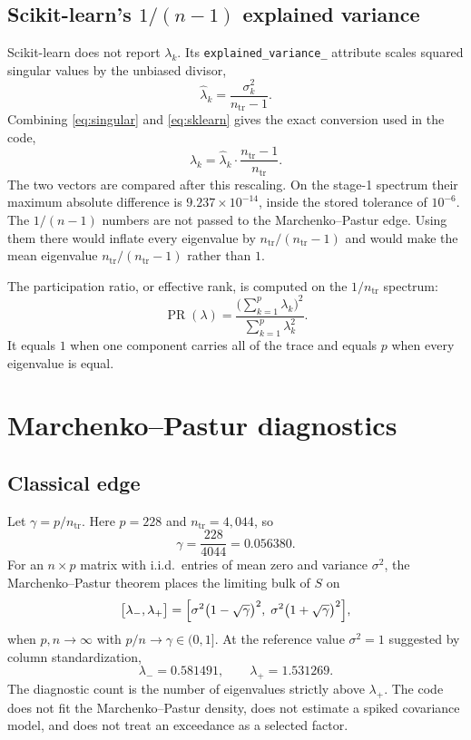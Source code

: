 \documentclass[11pt]{article}
\begin{document}
\subsection{Scikit-learn's \texorpdfstring{\(1/(n-1)\)}{1/(n-1)} explained variance}

Scikit-learn does not report \(\lambda_k\).
Its \texttt{explained\_variance\_} attribute scales squared singular values by the unbiased divisor,
\begin{equation}
\label{eq:sklearn}
\hat\lambda_k=\frac{\sigma_k^2}{n_{\mathrm{tr}}-1}.
\end{equation}
Combining \eqref{eq:singular} and \eqref{eq:sklearn} gives the exact conversion used in the code,
\begin{equation}
\label{eq:convert}
\lambda_k=\hat\lambda_k\cdot\frac{n_{\mathrm{tr}}-1}{n_{\mathrm{tr}}}.
\end{equation}
The two vectors are compared after this rescaling.
On the stage-1 spectrum their maximum absolute difference is \(9.237\times 10^{-14}\), inside the stored tolerance of \(10^{-6}\).
The \(1/(n-1)\) numbers are not passed to the Marchenko--Pastur edge.
Using them there would inflate every eigenvalue by \(n_{\mathrm{tr}}/(n_{\mathrm{tr}}-1)\) and would make the mean eigenvalue \(n_{\mathrm{tr}}/(n_{\mathrm{tr}}-1)\) rather than \(1\).

The participation ratio, or effective rank, is computed on the \(1/n_{\mathrm{tr}}\) spectrum:
\begin{equation}
\label{eq:pr}
\operatorname{PR}(\lambda)=\frac{\bigl(\sum_{k=1}^{p}\lambda_k\bigr)^2}{\sum_{k=1}^{p}\lambda_k^2}.
\end{equation}
It equals \(1\) when one component carries all of the trace and equals \(p\) when every eigenvalue is equal.

\section{Marchenko--Pastur diagnostics}
\label{sec:mp}

\subsection{Classical edge}

Let \(\gamma=p/n_{\mathrm{tr}}\).
Here \(p=228\) and \(n_{\mathrm{tr}}=4{,}044\), so
\[
\gamma=\frac{228}{4044}=0.056380.
\]
For an \(n\times p\) matrix with i.i.d.\ entries of mean zero and variance \(\sigma^2\), the Marchenko--Pastur theorem places the limiting bulk of \(S\) on
\begin{equation}
\label{eq:mp}
\bigl[\lambda_-,\lambda_+\bigr]
=\Bigl[\sigma^2\bigl(1-\sqrt{\gamma}\bigr)^2,\;
\sigma^2\bigl(1+\sqrt{\gamma}\bigr)^2\Bigr],
\end{equation}
when \(p,n\to\infty\) with \(p/n\to\gamma\in(0,1]\).
At the reference value \(\sigma^2=1\) suggested by column standardization,
\[
\lambda_-=0.581491,\qquad\lambda_+=1.531269.
\]
The diagnostic count is the number of eigenvalues strictly above \(\lambda_+\).
The code does not fit the Marchenko--Pastur density, does not estimate a spiked covariance model, and does not treat an exceedance as a selected factor.
\end{document}
